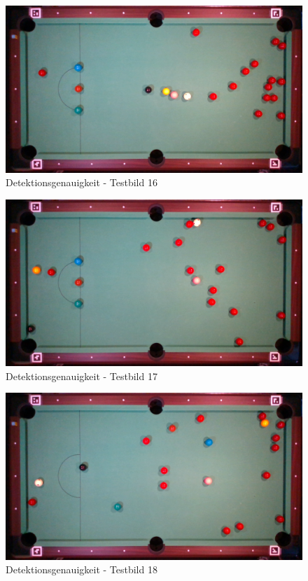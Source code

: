 \begin{figure}[h!]
    \begin{center}
        \includegraphics[width=0.8\linewidth]{../common/07_appendix/resources/00_detection/15_detektion_testbild_16.png}
    \end{center}
    \caption{Detektionsgenauigkeit - Testbild 16}
    \label{fig:detektionsgenauigkeit:testbild:16}
\end{figure}
\begin{figure}[h!]
    \begin{center}
        \includegraphics[width=0.8\linewidth]{../common/07_appendix/resources/00_detection/16_detektion_testbild_17.png}
    \end{center}
    \caption{Detektionsgenauigkeit - Testbild 17}
    \label{fig:detektionsgenauigkeit:testbild:17}
\end{figure}
\begin{figure}[h!]
    \begin{center}
        \includegraphics[width=0.8\linewidth]{../common/07_appendix/resources/00_detection/17_detektion_testbild_18.png}
    \end{center}
    \caption{Detektionsgenauigkeit - Testbild 18}
    \label{fig:detektionsgenauigkeit:testbild:18}
\end{figure}
